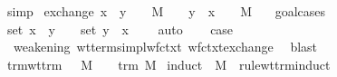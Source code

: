 \begin{isabellebody}
\ simp\isanewline
{}\isamarkupfalse%
%
\endisatagproof
{\isafoldproof}%
%
\isadelimproof
\isanewline
%
\endisadelimproof
\isanewline
{}\isamarkupfalse%
\ exchange{\isacharcolon}\ {\isachardoublequoteopen}{\isacharparenleft}x{\isacharcomma}{\isasymsigma}{\isacharparenright}\ {\isacharhash}\ {\isacharparenleft}y{\isacharcomma}{\isasympi}{\isacharparenright}\ {\isacharhash}\ {\isasymGamma}\ {\isasymturnstile}\ M\ {\isacharcolon}\ {\isasymdelta}\ {\isasymLongrightarrow}\ {\isacharparenleft}y{\isacharcomma}{\isasympi}{\isacharparenright}\ {\isacharhash}\ {\isacharparenleft}x{\isacharcomma}{\isasymsigma}{\isacharparenright}\ {\isacharhash}\ {\isasymGamma}\ {\isasymturnstile}\ M\ {\isacharcolon}\ {\isasymdelta}{\isachardoublequoteclose}\isanewline
%
\isadelimproof
%
\endisadelimproof
%
\isatagproof
{}\isamarkupfalse%
\ goal{\isacharunderscore}cases\isanewline
{}\isamarkupfalse%
\ {}\isanewline
\ \ \isamarkupfalse%
\ {\isachardoublequoteopen}set\ {\isacharparenleft}{\isacharparenleft}x{\isacharcomma}{\isasymsigma}{\isacharparenright}\ {\isacharhash}\ {\isacharparenleft}y{\isacharcomma}{\isasympi}{\isacharparenright}\ {\isacharhash}\ {\isasymGamma}{\isacharparenright}\ {\isasymsubseteq}\ set\ {\isacharparenleft}{\isacharparenleft}y{\isacharcomma}{\isasympi}{\isacharparenright}\ {\isacharhash}\ {\isacharparenleft}x{\isacharcomma}{\isasymsigma}{\isacharparenright}\ {\isacharhash}\ {\isasymGamma}{\isacharparenright}{\isachardoublequoteclose}\ \isamarkupfalse%
\ auto\isanewline
\ \ \isamarkupfalse%
\ {\isacharquery}case\ \isamarkupfalse%
\ {}\ weakening\ wt{\isacharunderscore}terms{\isacharunderscore}impl{\isacharunderscore}wf{\isacharunderscore}ctxt\ wf{\isacharunderscore}ctxt{\isacharunderscore}exchange\ \isamarkupfalse%
\ blast\isanewline
{}\isamarkupfalse%
%
\endisatagproof
{\isafoldproof}%
%
\isadelimproof
\isanewline
%
\endisadelimproof
\isanewline
{}\isamarkupfalse%
\ trm{\isacharunderscore}wt{\isacharunderscore}trm{\isacharcolon}\ {\isachardoublequoteopen}{\isasymGamma}\ {\isasymturnstile}\ M\ {\isacharcolon}\ {\isasymsigma}\ {\isasymLongrightarrow}\ trm\ M{\isachardoublequoteclose}\isanewline
%
\isadelimproof
%
\endisadelimproof
%
\isatagproof
{}\isamarkupfalse%
\ {\isacharparenleft}induct\ {\isasymGamma}\ M\ {\isasymsigma}\ rule{\isacharcolon}wt{\isacharunderscore}trm{\isachardot}induct{\isacharparenright}\isanewline
{}\isamarkupfalse%

\end{isabellebody}
